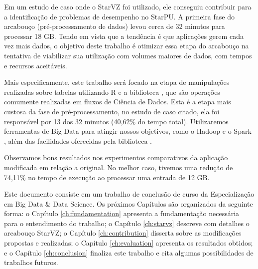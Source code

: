 Em um estudo de caso onde o StarVZ foi utilizado, ele conseguiu contribuir para 
a identificação de problemas de desempenho no StarPU. A primeira fase do 
arcabouço (pré-processamento de dados) levou cerca de 32 minutos para processar 
18 GB. Tendo em vista que a tendência é que aplicações gerem cada vez mais 
dados, o objetivo deste trabalho é otimizar essa etapa do arcabouço na tentativa 
de viabilizar sua utilização com volumes maiores de dados, com tempos e 
recursos aceitáveis.

Mais especificamente, este trabalho será focado na etapa de manipulações 
realizadas sobre tabelas utilizando R e a biblioteca , 
que são operações comumente realizadas em fluxos de Ciência de Dados. Esta 
é a etapa mais custosa da fase de pré-processamento, no estudo de caso citado, 
ela foi responsável por 13 dos 32 minutos (40,62\% do tempo total). 
Utilizaremos ferramentas de Big Data para atingir nossos objetivos, como o 
Hadoop \cite{ref:hadoopbook} e o Spark \cite{ref:sparkbook}, além das 
facilidades oferecidas pela biblioteca . 

Observamos bons resultados nos experimentos comparativos da aplicação 
modificada em relação a original. No melhor caso, tivemos uma redução de 
74,11\% no tempo de execução ao processar uma entrada de 12 GB.

Este documento consiste em um trabalho de conclusão de curso da Especialização 
em Big Data \& Data Science. Os próximos Capítulos são organizados da seguinte 
forma: o Capítulo \ref{ch:fundamentation} apresenta a fundamentação necessária 
para o entendimento do trabalho; o Capítulo \ref{ch:starvz} descreve com 
detalhes o arcabouço StarVZ; o Capítulo \ref{ch:contribution} disserta sobre as 
modificações propostas e realizadas; o Capítulo \ref{ch:evaluation} apresenta 
os resultados obtidos; e o Capítulo \ref{ch:conclusion} finaliza este trabalho e 
cita algumas possibilidades de trabalhos futuros.
